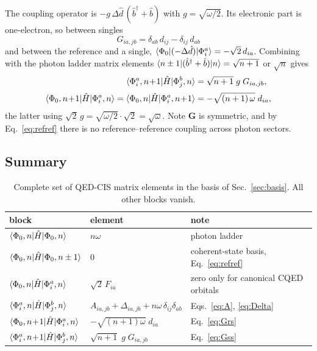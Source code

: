 \documentclass[11pt]{article}
\newcommand{\bd}{\hat{b}^{\dagger}}
\newcommand{\bo}{\hat{b}}
\begin{document}
The coupling operator is
$-g\,\Delta\hat{d}\,(\bd+\bo)$ with $g = \sqrt{\omega/2}$. Its electronic part
is one-electron, so between singles
\begin{equation}
\boxed{\;
G_{ia,jb} = \delta_{ab}\,d_{ij} - \delta_{ij}\,d_{ab}
\;}
\label{eq:G}
\end{equation}
and between the reference and a single,
$\braket{\Phi_0 | (-\Delta\hat{d}) | \Phi_i^a} = -\sqrt{2}\,d_{ia}$. Combining
with the photon ladder matrix elements
$\braket{n\pm1|(\bd+\bo)|n} = \sqrt{n+1}$ or $\sqrt{n}$ gives
\begin{align}
\braket{\Phi_i^a, n\!+\!1 | \hat{H} | \Phi_j^b, n}
 &= \sqrt{n+1}\;g\;G_{ia,jb},
\label{eq:Gss}\\[2pt]
\braket{\Phi_0, n\!+\!1 | \hat{H} | \Phi_i^a, n}
 = \braket{\Phi_0, n | \hat{H} | \Phi_i^a, n\!+\!1}
 &= -\sqrt{(n+1)\,\omega}\;d_{ia},
\label{eq:Grs}
\end{align}
the latter using $\sqrt{2}\,g = \sqrt{\omega/2}\cdot\sqrt{2} = \sqrt{\omega}$.
Note $\bm{G}$ is symmetric, and by Eq.~\eqref{eq:refref} there is no
reference--reference coupling across photon sectors.

\subsection{Summary}

\begin{table}[h]
\centering
\small
\renewcommand{\arraystretch}{1.35}
\begin{tabular}{@{}lll@{}}
\toprule
block & element & note \\
\midrule
$\braket{\Phi_0,n|\hat{H}|\Phi_0,n}$ & $n\omega$ & photon ladder \\
$\braket{\Phi_0,n|\hat{H}|\Phi_0,n\pm1}$ & $0$ & coherent-state basis, Eq.~\eqref{eq:refref} \\
$\braket{\Phi_0,n|\hat{H}|\Phi_i^a,n}$ & $\sqrt{2}\,F_{ia}$ & zero only for canonical CQED orbitals \\
$\braket{\Phi_i^a,n|\hat{H}|\Phi_j^b,n}$ & $A_{ia,jb} + \Delta_{ia,jb} + n\omega\,\delta_{ij}\delta_{ab}$ & Eqs.~\eqref{eq:A}, \eqref{eq:Delta} \\
$\braket{\Phi_0,n\!+\!1|\hat{H}|\Phi_i^a,n}$ & $-\sqrt{(n\!+\!1)\omega}\;d_{ia}$ & Eq.~\eqref{eq:Grs} \\
$\braket{\Phi_i^a,n\!+\!1|\hat{H}|\Phi_j^b,n}$ & $\sqrt{n\!+\!1}\;g\;G_{ia,jb}$ & Eq.~\eqref{eq:Gss} \\
\bottomrule
\end{tabular}
\caption{Complete set of QED-CIS matrix elements in the basis of
Sec.~\ref{sec:basis}. All other blocks vanish.}
\label{tab:elements}
\end{table}
\end{document}
